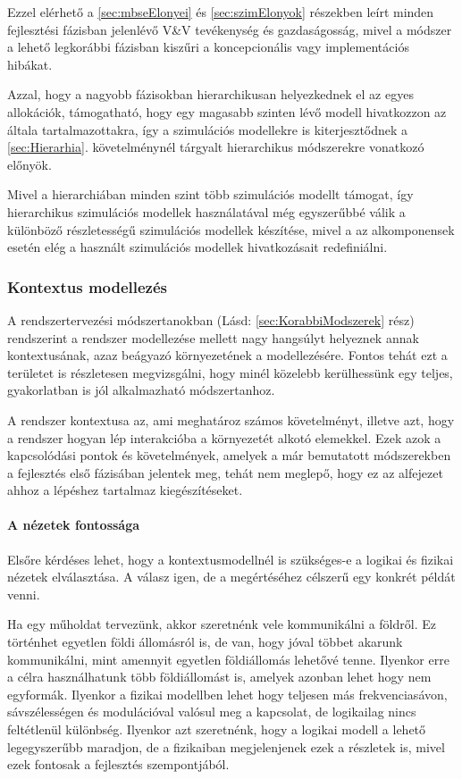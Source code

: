         Ezzel elérhető a \ref{sec:mbseElonyei} és \ref{sec:szimElonyok} részekben leírt minden fejlesztési fázisban jelenlévő V\&V tevékenység és gazdaságosság, mivel a módszer a lehető legkorábbi fázisban kiszűri a koncepcionális vagy implementációs hibákat.

        Azzal, hogy a nagyobb fázisokban hierarchikusan helyezkednek el az egyes allokációk, támogatható, hogy egy magasabb szinten lévő modell hivatkozzon az általa tartalmazottakra, így a szimulációs modellekre is kiterjesztődnek a \ref{sec:Hierarhia}. követelménynél tárgyalt hierarchikus módszerekre vonatkozó előnyök.
        
        Mivel a hierarchiában minden szint több szimulációs modellt támogat, így hierarchikus szimulációs modellek használatával még egyszerűbbé válik a különböző részletességű szimulációs modellek készítése, mivel a az alkomponensek esetén elég a használt szimulációs modellek hivatkozásait redefiniálni.

        \subsubsection{Kontextus modellezés}
        A rendszertervezési módszertanokban (Lásd: \ref{sec:KorabbiModszerek} rész) rendszerint a rendszer modellezése mellett nagy hangsúlyt helyeznek annak kontextusának, azaz beágyazó környezetének a modellezésére. Fontos tehát ezt a területet is részletesen megvizsgálni, hogy minél közelebb kerülhessünk egy teljes, gyakorlatban is jól alkalmazható módszertanhoz.

        A rendszer kontextusa az, ami meghatároz számos követelményt, illetve azt, hogy a rendszer hogyan lép interakcióba a környezetét alkotó elemekkel.
        Ezek azok a kapcsolódási pontok és követelmények, amelyek a már bemutatott módszerekben a fejlesztés első fázisában jelentek meg, tehát nem meglepő, hogy ez az alfejezet ahhoz a lépéshez tartalmaz kiegészítéseket.
        
            \paragraph{A nézetek fontossága}
            Elsőre kérdéses lehet, hogy a kontextusmodellnél is szükséges-e a logikai és fizikai nézetek elválasztása.
            A válasz igen, de a megértéséhez célszerű egy konkrét példát venni.
            
            Ha egy műholdat tervezünk, akkor szeretnénk vele kommunikálni a földről. Ez történhet egyetlen földi állomásról is, de van, hogy jóval többet akarunk kommunikálni, mint amennyit egyetlen földiállomás lehetővé tenne. Ilyenkor erre a célra használhatunk több földiállomást is, amelyek azonban lehet hogy nem egyformák. Ilyenkor a fizikai modellben lehet hogy teljesen más frekvenciasávon, sávszélességen és modulációval valósul meg a kapcsolat, de logikailag nincs feltétlenül különbség.
            Ilyenkor azt szeretnénk, hogy a logikai modell a lehető legegyszerűbb maradjon, de a fizikaiban megjelenjenek ezek a részletek is, mivel ezek fontosak a fejlesztés szempontjából.

